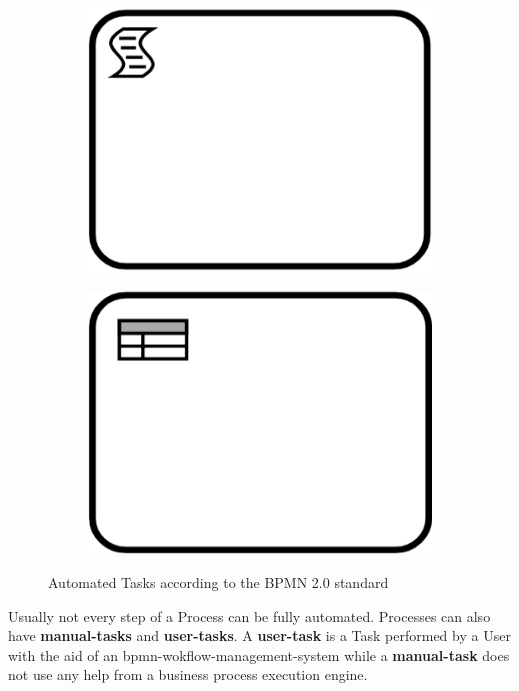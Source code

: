 \begin{figure}[h]
\begin{subfigure}[b]{0.18\columnwidth}
		\label{fig:receivetask}
	\end{subfigure}
	\begin{subfigure}[b]{0.18\columnwidth}
		\centering
		\includegraphics[width=0.9\columnwidth]{graphics/script-task}
		\label{fig:scripttask}
	\end{subfigure}
	\begin{subfigure}[b]{0.24\columnwidth}
		\includegraphics[width=0.675\columnwidth]{graphics/businessrule-task}
		\label{fig:businessruletask}
	\end{subfigure}
	\caption{Automated Tasks according to the BPMN 2.0 standard \cite{bpmnstandard}} %
	\label{fig:automatedtasks} %
\end{figure}

Usually not every step of a Process can be fully automated. Processes can also have \textbf{\gls{manual-task}s} and \textbf{\gls{user-task}s}. A \textbf{\gls{user-task}} is a Task performed by a User with the aid of an \gls{bpmn-wokflow-management-system} while a \textbf{\gls{manual-task}} does not use any help from a business process execution engine. 

